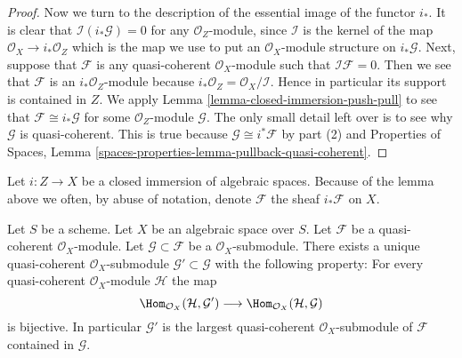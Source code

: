 \begin{proof}
\medskip\noindent
Now we turn to the description of the essential image of the
functor $i_*$. It is clear that $\mathcal{I}(i_*\mathcal{G}) = 0$
for any $\mathcal{O}_Z$-module, since $\mathcal{I}$ is the kernel
of the map $\mathcal{O}_X \to i_*\mathcal{O}_Z$ which is the map
we use to put an $\mathcal{O}_X$-module structure on $i_*\mathcal{G}$.
Next, suppose that $\mathcal{F}$ is any quasi-coherent
$\mathcal{O}_X$-module such that $\mathcal{I}\mathcal{F} = 0$.
Then we see that $\mathcal{F}$ is an $i_*\mathcal{O}_Z$-module
because $i_*\mathcal{O}_Z = \mathcal{O}_X/\mathcal{I}$. Hence in
particular its support is contained in $Z$. We apply
Lemma \ref{lemma-closed-immersion-push-pull}
to see that $\mathcal{F} \cong i_*\mathcal{G}$ for some
$\mathcal{O}_Z$-module $\mathcal{G}$. The only small detail left over
is to see why $\mathcal{G}$ is quasi-coherent. This is true
because $\mathcal{G} \cong i^*\mathcal{F}$ by part (2) and
Properties of Spaces,
Lemma \ref{spaces-properties-lemma-pullback-quasi-coherent}.
\end{proof}

\noindent
Let $i : Z \to X$ be a closed immersion of algebraic spaces.
Because of the lemma above we often,
by abuse of notation, denote $\mathcal{F}$ the sheaf $i_*\mathcal{F}$ on $X$.

\begin{lemma}
\label{lemma-largest-quasi-coherent-subsheaf}
Let $S$ be a scheme. Let $X$ be an algebraic space over $S$.
Let $\mathcal{F}$ be a quasi-coherent $\mathcal{O}_X$-module.
Let $\mathcal{G} \subset \mathcal{F}$ be a $\mathcal{O}_X$-submodule.
There exists a unique quasi-coherent $\mathcal{O}_X$-submodule
$\mathcal{G}' \subset \mathcal{G}$ with the following property:
For every quasi-coherent $\mathcal{O}_X$-module $\mathcal{H}$ the map
$$
\Hom_{\mathcal{O}_X}(\mathcal{H}, \mathcal{G}')
\longrightarrow
\Hom_{\mathcal{O}_X}(\mathcal{H}, \mathcal{G})
$$
is bijective. In particular $\mathcal{G}'$ is the largest quasi-coherent
$\mathcal{O}_X$-submodule of $\mathcal{F}$ contained in $\mathcal{G}$.
\end{lemma}

